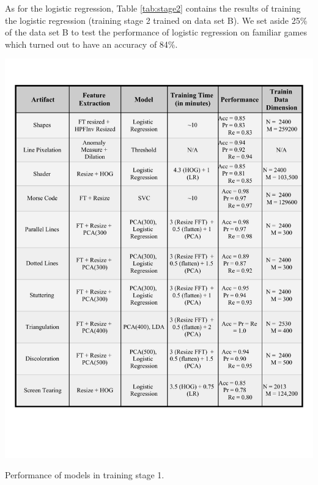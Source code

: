 \noindent
As for the logistic regression, Table \ref{tab:stage2} contains the results of training the logistic regression (training stage 2 trained on data set B). We set aside 25\% of the data set B to test the performance of logistic regression on familiar games which turned out to have an accuracy of 84\%.
\begin{table}[h]
    \centering
    \includegraphics[scale=0.8]{tables/models.pdf}
    \caption{Performance of models in training stage 1.}
    \label{tab:models}
\end{table}



